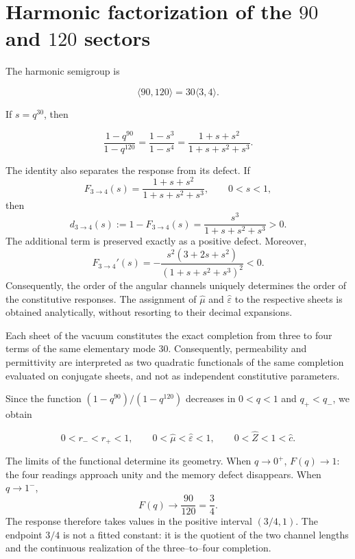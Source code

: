\section{Harmonic factorization of the \(90\) and \(120\) sectors}

The harmonic semigroup is

\[
\langle90,120\rangle=30\langle3,4\rangle.
\]

If \(s=q^{30}\), then

\begin{equation}
\frac{1-q^{90}}{1-q^{120}}
=\frac{1-s^3}{1-s^4}
=\frac{1+s+s^2}{1+s+s^2+s^3}.
\label{eq:three-four-completion}
\end{equation}

The identity also separates the response from its defect. If
\[
F_{3\to4}(s)=\frac{1+s+s^2}{1+s+s^2+s^3},
\qquad 0<s<1,
\]
then
\begin{equation}
d_{3\to4}(s):=1-F_{3\to4}(s)
=\frac{s^3}{1+s+s^2+s^3}>0.
\label{eq:vacuum-defect34}
\end{equation}
The additional term is preserved exactly as a positive
defect. Moreover,
\begin{equation}
F_{3\to4}'(s)
=-\frac{s^2(3+2s+s^2)}{(1+s+s^2+s^3)^2}<0.
\label{eq:vacuum-monotonic34}
\end{equation}
Consequently, the order of the angular channels uniquely determines
the order of the constitutive responses. The assignment of
\(\widehat\mu\) and \(\widehat\varepsilon\) to the respective sheets is obtained
analytically, without resorting to their decimal expansions.

Each sheet of the vacuum constitutes the exact completion from three to four
terms of the same elementary mode \(30\). Consequently, permeability
and permittivity are interpreted as two quadratic functionals of the same
completion evaluated on conjugate sheets, and not as independent
constitutive parameters.

Since the function \((1-q^{90})/(1-q^{120})\) decreases in \(0<q<1\) and \(q_+<q_-\), we obtain

\[
0<r_-<r_+<1,\qquad
0<\widehat\mu<\widehat\varepsilon<1,\qquad
0<\widehat Z<1<\widehat c.
\]

The limits of the functional determine its geometry. When \(q\to0^+\),
\(F(q)\to1\): the four readings approach unity and the memory
defect disappears. When \(q\to1^-\),
\[
F(q)\longrightarrow\frac{90}{120}=\frac34.
\]
The response therefore takes values in the positive interval \((3/4,1)\). The
endpoint \(3/4\) is not a fitted constant: it is the quotient of the two
channel lengths and the continuous realization of the
three--to--four completion.


